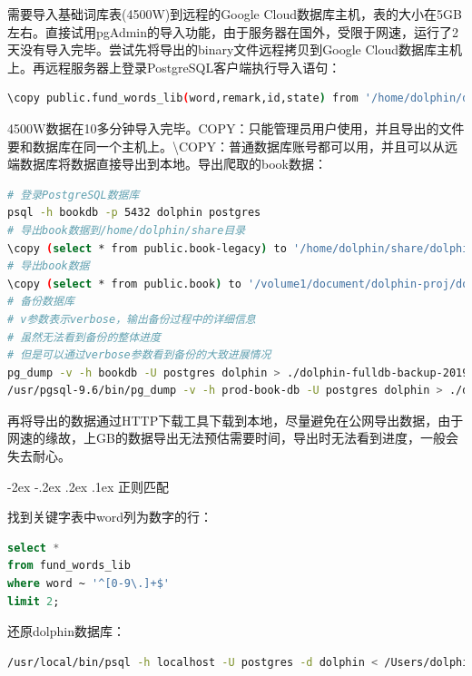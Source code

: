 \documentclass[8pt]{book}
\makeatletter
\numberwithin{dummy}{section}
\theoremstyle{ocrenumbox}
\theoremstyle{blacknumex}
\theoremstyle{blacknumbox}
\theoremstyle{ocrenum}
\renewcommand\paragraph{\@startsection{paragraph}{4}{\z@}
	{-2ex \@plus-.2ex \@minus .2ex}
	{.1ex}
	{\normalfont\small\sffamily\bfseries}}
\makeatother
\begin{document}
需要导入基础词库表(4500W)到远程的Google Cloud数据库主机，表的大小在5GB左右。直接试用pgAdmin的导入功能，由于服务器在国外，受限于网速，运行了2天没有导入完毕。尝试先将导出的binary文件远程拷贝到Google Cloud数据库主机上。再远程服务器上登录PostgreSQL客户端执行导入语句：

\begin{lstlisting}[language=Bash]
\copy public.fund_words_lib(word,remark,id,state) from '/home/dolphin/dolphin-words' encoding 'utf8';
\end{lstlisting}

4500W数据在10多分钟导入完毕。COPY：只能管理员用户使用，并且导出的文件要和数据库在同一个主机上。\textbackslash COPY：普通数据库账号都可以用，并且可以从远端数据库将数据直接导出到本地。导出爬取的book数据：

\begin{lstlisting}[language=Bash]
# 登录PostgreSQL数据库
psql -h bookdb -p 5432 dolphin postgres
# 导出book数据到/home/dolphin/share目录
\copy (select * from public.book-legacy) to '/home/dolphin/share/dolphin-book-binary-bak-201904012112' with Binary
# 导出book数据
\copy (select * from public.book) to '/volume1/document/dolphin-proj/dolphin-book-text-bak-201902091012'
# 备份数据库
# v参数表示verbose，输出备份过程中的详细信息
# 虽然无法看到备份的整体进度
# 但是可以通过verbose参数看到备份的大致进展情况
pg_dump -v -h bookdb -U postgres dolphin > ./dolphin-fulldb-backup-201902100030.bak
/usr/pgsql-9.6/bin/pg_dump -v -h prod-book-db -U postgres dolphin > ./dolphin-fulldb-backup-201903261013.bak
\end{lstlisting}

再将导出的数据通过HTTP下载工具下载到本地，尽量避免在公网导出数据，由于网速的缘故，上GB的数据导出无法预估需要时间，导出时无法看到进度，一般会失去耐心。

\paragraph{正则匹配}

找到关键字表中word列为数字的行：

\begin{lstlisting}[language=SQL]
select * 
from fund_words_lib 
where word ~ '^[0-9\.]+$' 
limit 2;
\end{lstlisting}

还原dolphin数据库：

\begin{lstlisting}[language=Bash]
/usr/local/bin/psql -h localhost -U postgres -d dolphin < /Users/dolphin/Downloads/dolphin-fulldb-backup-201904130913.bak
\end{lstlisting}
\end{document}
